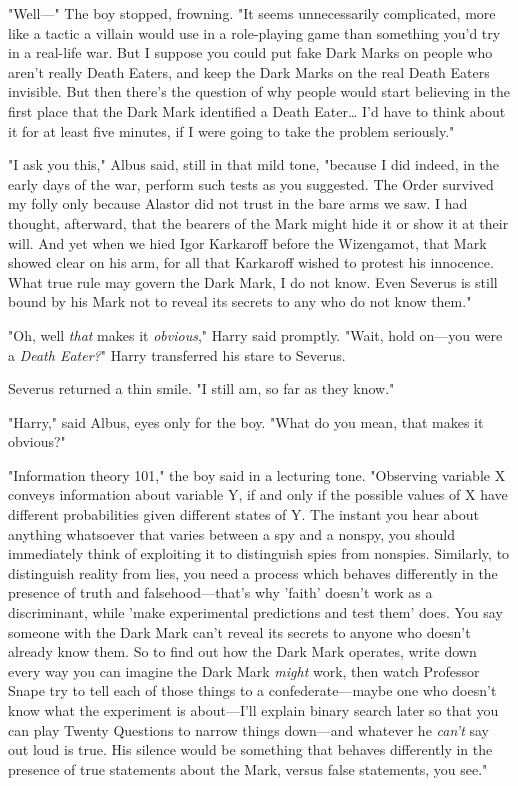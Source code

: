 "Well---" The boy stopped, frowning. "It seems unnecessarily complicated, more 
like a tactic a villain would use in a role-playing game than something you'd 
try in a real-life war. But I suppose you could put fake Dark Marks on people 
who aren't really Death Eaters, and keep the Dark Marks on the real Death 
Eaters invisible. But then there's the question of why people would start 
believing in the first place that the Dark Mark identified a Death 
Eater{\ldots} I'd have to think about it for at least five minutes, if I were 
going to take the problem seriously."

"I ask you this," Albus said, still in that mild tone, "because I did indeed, 
in the early days of the war, perform such tests as you suggested. The Order 
survived my folly only because Alastor did not trust in the bare arms we saw. I 
had thought, afterward, that the bearers of the Mark might hide it or show it 
at their will. And yet when we hied Igor Karkaroff before the Wizengamot, that 
Mark showed clear on his arm, for all that Karkaroff wished to protest his 
innocence. What true rule may govern the Dark Mark, I do not know. Even Severus 
is still bound by his Mark not to reveal its secrets to any who do not know 
them."

"Oh, well \emph{that} makes it \emph{obvious}," Harry said promptly. "Wait, 
hold on---you were a \emph{Death Eater?}" Harry transferred his stare to 
Severus.

Severus returned a thin smile. "I still am, so far as they know."

"Harry," said Albus, eyes only for the boy. "What do you mean, that makes it 
obvious?"

"Information theory 101," the boy said in a lecturing tone. "Observing variable 
X conveys information about variable Y, if and only if the possible values of X 
have different probabilities given different states of Y. The instant you hear 
about anything whatsoever that varies between a spy and a nonspy, you should 
immediately think of exploiting it to distinguish spies from nonspies. 
Similarly, to distinguish reality from lies, you need a process which behaves 
differently in the presence of truth and falsehood---that's why 'faith' doesn't 
work as a discriminant, while 'make experimental predictions and test them' 
does. You say someone with the Dark Mark can't reveal its secrets to anyone who 
doesn't already know them. So to find out how the Dark Mark operates, write 
down every way you can imagine the Dark Mark \emph{might} work, then watch 
Professor Snape try to tell each of those things to a confederate---maybe one 
who doesn't know what the experiment is about---I'll explain binary search 
later so that you can play Twenty Questions to narrow things down---and 
whatever he \emph{can't} say out loud is true. His silence would be something 
that behaves differently in the presence of true statements about the Mark, 
versus false statements, you see."

